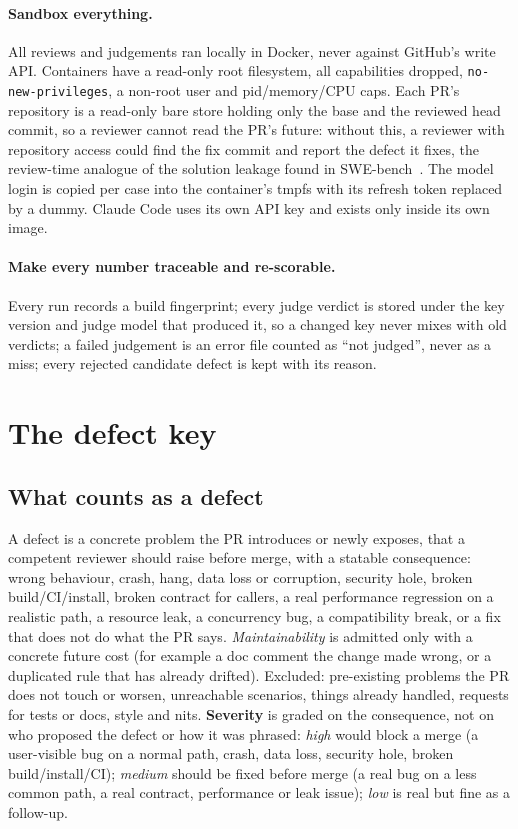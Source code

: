 \documentclass[11pt,a4paper]{article}
\newcommand{\code}[1]{\texttt{#1}}
\begin{document}
\paragraph{Sandbox everything.} All reviews and judgements ran locally in
Docker, never against GitHub's write API. Containers have a read-only root
filesystem, all capabilities dropped, \code{no-new-privileges}, a non-root
user and pid/memory/CPU caps. Each PR's repository is a read-only bare
store holding only the base and the reviewed head commit, so a reviewer
cannot read the PR's future: without this, a reviewer with repository
access could find the fix commit and report the defect it fixes, the
review-time analogue of the solution leakage found in
SWE-bench~\cite{aleithan2024}. The model login is copied per case into the
container's tmpfs with its refresh token replaced by a dummy. Claude Code
uses its own API key and exists only inside its own image.

\paragraph{Make every number traceable and re-scorable.} Every run records
a build fingerprint; every judge verdict is stored under the key version and
judge model that produced it, so a changed key never mixes with old
verdicts; a failed judgement is an error file counted as ``not judged'',
never as a miss; every rejected candidate defect is kept with its reason.

\section{The defect key}
\label{sec:gt}

\subsection{What counts as a defect}

A defect is a concrete problem the PR introduces or newly exposes, that a
competent reviewer should raise before merge, with a statable consequence:
wrong behaviour, crash, hang, data loss or corruption, security hole,
broken build/CI/install, broken contract for callers, a real performance
regression on a realistic path, a resource leak, a concurrency bug, a
compatibility break, or a fix that does not do what the PR says.
\emph{Maintainability} is admitted only with a concrete future cost (for
example a doc comment the change made wrong, or a duplicated rule that has
already drifted). Excluded: pre-existing problems the PR does not touch or
worsen, unreachable scenarios, things already handled, requests for tests or
docs, style and nits. \textbf{Severity} is graded on the consequence, not on
who proposed the defect or how it was phrased: \emph{high} would block a
merge (a user-visible bug on a normal path, crash, data loss, security hole,
broken build/install/CI); \emph{medium} should be fixed before merge (a real
bug on a less common path, a real contract, performance or leak issue);
\emph{low} is real but fine as a follow-up.
\end{document}

